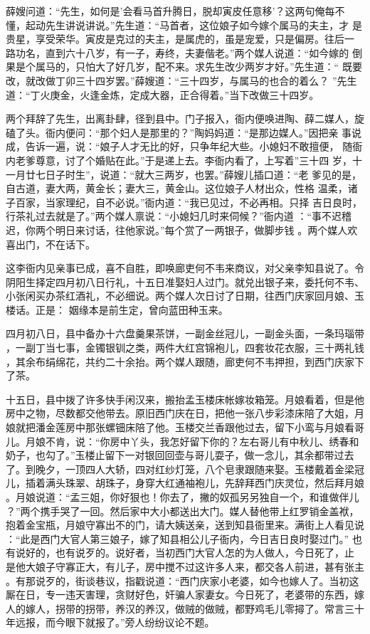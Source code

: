 薛嫂问道：“先生，如何是'会看马首升腾日，脱却寅皮任意移'？这两句俺每不
懂，起动先生讲说讲说。”先生道：“马首者，这位娘子如今嫁个属马的夫主，才
是贵星，享受荣华。寅皮是克过的夫主，是属虎的，虽是宠爱，只是偏房。往后一
路功名，直到六十八岁，有一子，寿终，夫妻偕老。”两个媒人说道：“如今嫁的
倒果是个属马的，只怕大了好几岁，配不来。求先生改少两岁才好。”先生道：“
既要改，就改做丁卯三十四岁罢。”薛嫂道：“三十四岁，与属马的也合的着么？
”先生道：“丁火庚金，火逢金炼，定成大器，正合得着。”当下改做三十四岁。

两个拜辞了先生，出离卦肆，径到县中。门子报入，衙内便唤进陶、薛二媒人，旋
磕了头。衙内便问：“那个妇人是那里的？”陶妈妈道：“是那边媒人。”因把亲
事说成，告诉一遍，说：“娘子人才无比的好，只争年纪大些。小媳妇不敢擅便，
随衙内老爹尊意，讨了个婚贴在此。”于是递上去。李衙内看了，上写着”三十四
岁，十一月廿七日子时生”，说道：“就大三两岁，也罢。”薛嫂儿插口道：“老
爹见的是，自古道，妻大两，黄金长；妻大三，黄金山。这位娘子人材出众，性格
温柔，诸子百家，当家理纪，自不必说。”衙内道：“我已见过，不必再相。只择
吉日良时，行茶礼过去就是了。”两个媒人禀说：“小媳妇几时来伺候？”衙内道
：“事不迟稽迟，你两个明日来讨话，往他家说。”每个赏了一两银子，做脚步钱
。两个媒人欢喜出门，不在话下。

这李衙内见亲事已成，喜不自胜，即唤廊吏何不韦来商议，对父亲李知县说了。令
阴阳生择定四月初八日行礼，十五日准娶妇人过门。就兑出银子来，委托何不韦、
小张闲买办茶红酒礼，不必细说。两个媒人次日讨了日期，往西门庆家回月娘、玉
楼话。正是：
姻缘本是前生定，曾向蓝田种玉来。

四月初八日，县中备办十六盘羹果茶饼，一副金丝冠儿，一副金头面，一条玛瑙带
，一副丁当七事，金镯银钏之类，两件大红宫锦袍儿，四套妆花衣服，三十两礼钱
，其余布绢绵花，共约二十余抬。两个媒人跟随，廊吏何不韦押担，到西门庆家下
了茶。

十五日，县中拨了许多快手闲汉来，搬抬孟玉楼床帐嫁妆箱笼。月娘看着，但是他
房中之物，尽数都交他带去。原旧西门庆在日，把他一张八步彩漆床陪了大姐，月
娘就把潘金莲房中那张螺钿床陪了他。玉楼交兰香跟他过去，留下小鸾与月娘看哥
儿。月娘不肯，说：“你房中丫头，我怎好留下你的？左右哥儿有中秋儿、绣春和
奶子，也勾了。”玉楼止留下一对银回回壶与哥儿耍子，做一念儿，其余都带过去
了。到晚夕，一顶四人大轿，四对红纱灯笼，八个皂隶跟随来娶。玉楼戴着金梁冠
儿，插着满头珠翠、胡珠子，身穿大红通袖袍儿，先辞拜西门庆灵位，然后拜月娘
。月娘说道：“孟三姐，你好狠也！你去了，撇的奴孤另另独自一个，和谁做伴儿
？”两个携手哭了一回。然后家中大小都送出大门。媒人替他带上红罗销金盖袱，
抱着金宝瓶，月娘守寡出不的门，请大姨送亲，送到知县衙里来。满街上人看见说
：“此是西门大官人第三娘子，嫁了知县相公儿子衙内，今日吉日良时娶过门。”
也有说好的，也有说歹的。说好者，当初西门大官人怎的为人做人，今日死了，止
是他大娘子守寡正大，有儿子，房中搅不过这许多人来，都交各人前进，甚有张主
。有那说歹的，街谈巷议，指戳说道：“西门庆家小老婆，如今也嫁人了。当初这
厮在日，专一违天害理，贪财好色，奸骗人家妻女。今日死了，老婆带的东西，嫁
人的嫁人，拐带的拐带，养汉的养汉，做贼的做贼，都野鸡毛儿零撏了。常言三十
年远报，而今眼下就报了。”旁人纷纷议论不题。

